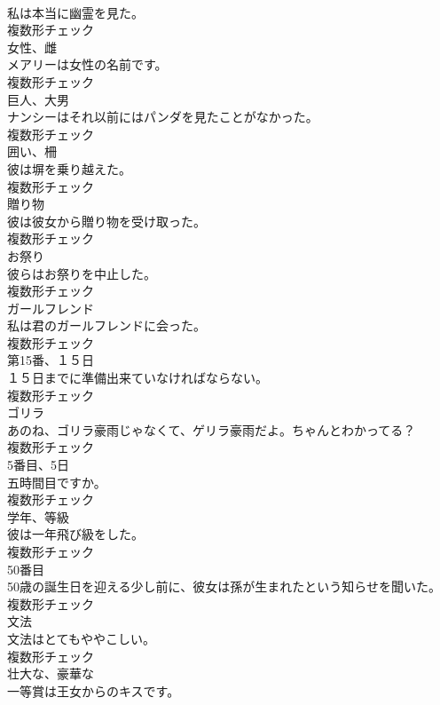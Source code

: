 \documentclass[8pt]{extreport}
\begin{document}
\begin{CJK}{UTF8}{min}
\\	私は本当に幽霊を見た。	
\\	複数形チェック
\\	[名詞]	女性、雌	
\\	メアリーは女性の名前です。	
\\	複数形チェック
\\	[名詞]	巨人、大男	
\\	ナンシーはそれ以前にはパンダを見たことがなかった。	
\\	複数形チェック
\\	[名詞]	囲い、柵	
\\	彼は塀を乗り越えた。	
\\	複数形チェック
\\	[名詞]	贈り物	
\\	彼は彼女から贈り物を受け取った。	
\\	複数形チェック
\\	[名詞]	お祭り	
\\	彼らはお祭りを中止した。	
\\	複数形チェック
\\	[名詞]	ガールフレンド	
\\	私は君のガールフレンドに会った。	
\\	複数形チェック
\\	[名詞]	第15番、１５日	
\\	１５日までに準備出来ていなければならない。	
\\	複数形チェック
\\	[名詞]	ゴリラ	
\\	あのね、ゴリラ豪雨じゃなくて、ゲリラ豪雨だよ。ちゃんとわかってる？	
\\	複数形チェック
\\	[名詞]	5番目、5日	
\\	五時間目ですか。	
\\	複数形チェック
\\	[名詞]	学年、等級	
\\	彼は一年飛び級をした。	
\\	複数形チェック
\\	[名詞]	50番目	
\\	50歳の誕生日を迎える少し前に、彼女は孫が生まれたという知らせを聞いた。	
\\	複数形チェック
\\	[名詞]	文法	
\\	文法はとてもややこしい。	
\\	複数形チェック
\\	[形容詞]	壮大な、豪華な	
\\	一等賞は王女からのキスです。	

\end{CJK}
\end{document}
